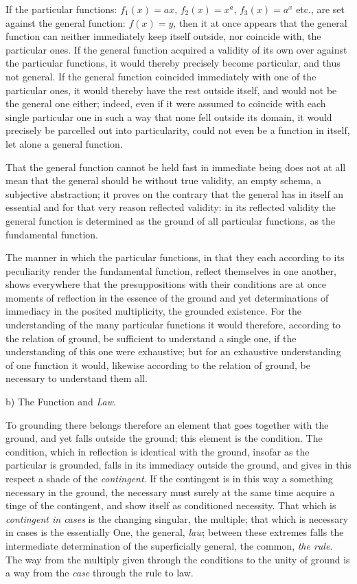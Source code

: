 \documentclass[12pt,a4paper,openany]{book}
\newcommand{\opage}[1]{\marginnote{\footnotesize\textit{[#1]}}}
\begin{document}
If the particular functions: $f_{1}(x)=ax$, $f_{2}(x)=x^{a}$,
$f_{3}(x)=a^{x}$ etc., are set against the general function: $f(x)=y$, then it at once appears that the general function can neither immediately
keep itself outside, nor coincide with, the
particular ones. If the general function acquired a validity of its own over against
the particular functions, it would thereby precisely become
particular, and thus not general. If the general function
coincided immediately with one of the particular ones, it would thereby
have the rest outside itself, and would not be the general one either;
indeed, even if it were assumed to coincide with each single particular one in such a way
that none fell outside its domain,
it would precisely be parcelled out into particularity, could not even
be a function in itself, let alone a general function.

That the general function cannot be held fast in immediate being does not at all mean that the general should
be without true validity, an empty schema, a subjective
abstraction; it proves on the contrary that the general has in itself
an essential and for that very reason reflected validity: in its
reflected validity the general function is determined as
the ground of all particular functions, as the fundamental function.

The manner in which the particular functions, in that they
each according to its peculiarity render the fundamental function,
reflect themselves in one another, shows everywhere that the presuppositions
with their conditions are at once moments of reflection
in the essence of the ground and yet determinations of immediacy
in the posited multiplicity, the grounded
\setcounter{footnote}{0}%
\opage{12}existence. For the understanding of the many particular functions
it would therefore, according to the relation of ground, be sufficient
to understand a single one, if the understanding of this one were
exhaustive; but for an exhaustive understanding of one
function it would, likewise according to the relation of ground, be
necessary to understand them all.

\begin{center}b) The Function and \emph{Law}.\end{center}

To grounding there belongs therefore an element that goes
together with the ground, and yet falls outside the ground;
this element is the condition. The condition, which in reflection
is identical with the ground, insofar as the particular is grounded,
falls in its immediacy outside the ground, and gives in
this respect a shade of the \emph{contingent}. If the
contingent is in this way a something necessary in the ground,
the necessary must surely at the same time acquire a tinge of
the contingent, and show itself as conditioned necessity. That
which is \emph{contingent in cases} is the changing singular, the
multiple; that which is necessary in cases is the essentially
One, the general, \emph{law}; between these extremes falls
the intermediate determination of the superficially general, the common,
\emph{the rule}. The way from the multiply given through the conditions
to the unity of ground is a way from the \emph{case} through the rule to law.
\end{document}
